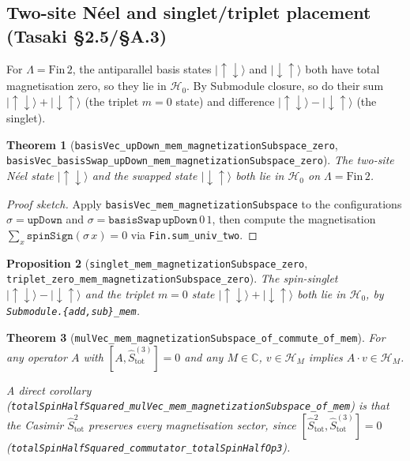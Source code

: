 \documentclass[a4paper,11pt]{article}
\newtheorem{theorem}{Theorem}
\newtheorem{proposition}[theorem]{Proposition}
\begin{document}
\subsection{Two-site Néel and singlet/triplet placement (Tasaki §2.5/§A.3)}
\label{subsec:two-site-singlet-mag}

For $\Lambda = \mathrm{Fin}\,2$, the antiparallel basis states
$|{\uparrow}{\downarrow}\rangle$ and $|{\downarrow}{\uparrow}\rangle$
both have total magnetisation zero, so they lie in $\mathcal H_{0}$.
By Submodule closure, so do their sum $|{\uparrow}{\downarrow}\rangle
+ |{\downarrow}{\uparrow}\rangle$ (the triplet $m=0$ state) and
difference $|{\uparrow}{\downarrow}\rangle -
|{\downarrow}{\uparrow}\rangle$ (the singlet).

\begin{theorem}[\texttt{basisVec\_upDown\_mem\_magnetizationSubspace\_zero},
\texttt{basisVec\_basisSwap\_upDown\_mem\_magnetizationSubspace\_zero}]
The two-site Néel state $|{\uparrow}{\downarrow}\rangle$ and the
swapped state $|{\downarrow}{\uparrow}\rangle$ both lie in
$\mathcal H_{0}$ on $\Lambda = \mathrm{Fin}\,2$.
\end{theorem}

\begin{proof}[Proof sketch]
Apply \texttt{basisVec\_mem\_magnetizationSubspace} to the
configurations $\sigma = \texttt{upDown}$ and
$\sigma = \texttt{basisSwap}\,\texttt{upDown}\,0\,1$, then compute
the magnetisation $\sum_{x}\texttt{spinSign}(\sigma\,x) = 0$ via
\texttt{Fin.sum\_univ\_two}.
\end{proof}

\begin{proposition}[\texttt{singlet\_mem\_magnetizationSubspace\_zero},
\texttt{triplet\_zero\_mem\_magnetizationSubspace\_zero}]
The spin-singlet $|{\uparrow}{\downarrow}\rangle -
|{\downarrow}{\uparrow}\rangle$ and the triplet $m=0$ state
$|{\uparrow}{\downarrow}\rangle + |{\downarrow}{\uparrow}\rangle$
both lie in $\mathcal H_{0}$, by \texttt{Submodule.\{add,sub\}\_mem}.
\end{proposition}

\begin{theorem}[\texttt{mulVec\_mem\_magnetizationSubspace\_of\_commute\_of\_mem}]
For any operator $A$ with $[A,\hat S_{\mathrm{tot}}^{(3)}] = 0$ and
any $M \in \mathbb{C}$,
$v \in \mathcal H_{M}$ implies $A \cdot v \in \mathcal H_{M}$.

A direct corollary
(\texttt{totalSpinHalfSquared\_mulVec\_mem\_magnetizationSubspace\_of\_mem})
is that the Casimir $\hat S_{\mathrm{tot}}^{2}$ preserves every
magnetisation sector, since
$[\hat S_{\mathrm{tot}}^{2}, \hat S_{\mathrm{tot}}^{(3)}] = 0$
(\texttt{totalSpinHalfSquared\_commutator\_totalSpinHalfOp3}).
\end{theorem}
\end{document}
